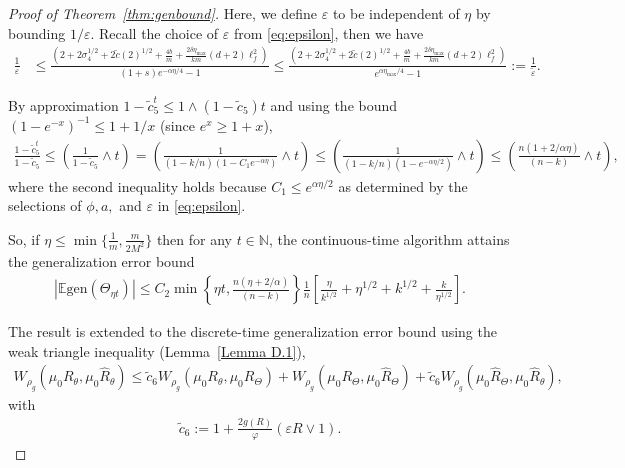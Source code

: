 \documentclass{article}
\begin{document}
\begin{proof}[Proof of Theorem~\ref{thm:genbound}]
        Here, we define $\varepsilon$ to be independent of $\eta$ by bounding $1/\varepsilon$. Recall the choice of $\varepsilon$ from \eqref{eq:epsilon}, then we have 
        \begin{align*}
            \frac{1}{\varepsilon}& \leq \frac{\left({ 2 + 2\sigma_4^{1/2} +2\tilde{c}(2)^{1/2} + \frac{4b}{m} + \frac{2\delta \eta_{\max}}{km} (d +2) \ell_f^2}\right)}{(1+s)e^{-\alpha \eta / 4} -1} 
            \leq \frac{\left({ 2 + 2\sigma_4^{1/2} +2\tilde{c}(2)^{1/2} + \frac{4b}{m} + \frac{2\delta \eta_{\max}}{km} (d +2) \ell_f^2}\right)}{e^{\alpha \eta_{\max} / 4} -1} := \frac{1}{\widetilde{\varepsilon}}.
        \end{align*}
	
	By approximation $1-\tilde{c}_5^t \leq 1 \wedge (1-\tilde{c}_5)t$ and using the bound $(1-e^{-x})^{-1} \leq 1 + 1/x$ 
    (since $e^x \geq 1+x$),
	\begin{align*}
		\frac{1-\tilde{c}_5^t}{1-\tilde{c}_5} \leq \left(\frac{1}{1-\tilde{c}_5} \wedge t\right)=\left(\frac{1}{(1-k/n)(1-C_1 e^{-\alpha \eta})} \wedge t \right) \leq \left(\frac{1}{(1-k/n)(1-e^{-\alpha \eta /2})} \wedge t \right) \leq \left(\frac{n(1+2/\alpha \eta)}{(n-k)} \wedge t\right),
	\end{align*}
        where the second inequality holds because $C_1 \leq e^{\alpha \eta / 2}$ as determined by the selections of $\phi, a,$ and $\varepsilon$ in \eqref{eq:epsilon}.
	
	So, if $\eta \leq \min\{\frac{1}{m}, \frac{m}{2M^2}\}$ then for any $t \in \mathbb{N}$, the continuous-time algorithm attains the generalization error bound
	\begin{align*}
		|\mathbb{E} \mathrm{gen}(\Theta_{\eta t})| \leq C_2 \min \left\{\eta t, \frac{n(\eta +2/\alpha)}{(n-k)} \right\} \frac{1}{n}   \left[\frac{\eta}{k^{1/2}}  +\eta^{1/2} + k^{1/2}  +  \frac{k}{\eta^{1/2}} \right].
	\end{align*}
	
	The result is extended to the discrete-time generalization error bound using the weak triangle inequality (Lemma~\ref{Lemma D.1}),
	\begin{align}\label{ineq:W}
		W_{\rho_g}(\mu_0 R_\theta , \mu_0 \widehat{R}_\theta) \leq \tilde{c}_6 W_{\rho_g} (\mu_0 R_\theta, \mu_0 R_\Theta) + W_{\rho_g} (\mu_0 R_\Theta, \mu_0 \widehat{R}_\Theta) + \tilde{c}_6 W_{\rho_g} (\mu_0 \widehat{R}_\Theta, \mu_0 \widehat{R}_\theta),
	\end{align}
	with 
	\begin{align}\label{const:c6}
		\tilde{c}_6 := 1 + \frac{2 g(R)}{\varphi} (\varepsilon R \vee 1).
	\end{align}
	

\end{proof}
\end{document}
